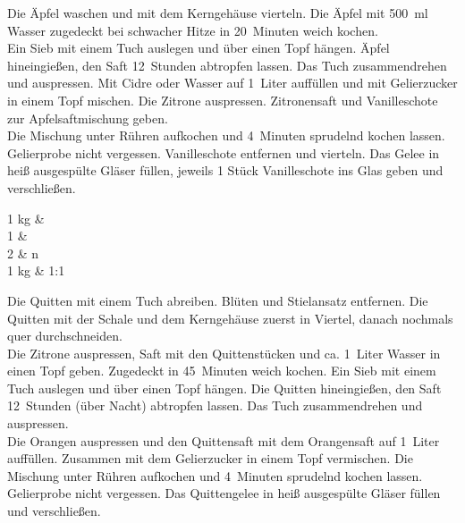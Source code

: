 
      \begin{zubereitung}
        Die Äpfel waschen und mit dem Kerngehäuse vierteln. Die Äpfel mit
	500~ml Wasser zugedeckt bei schwacher Hitze in 20~Minuten weich
	kochen. \\
	Ein Sieb mit einem Tuch auslegen und über einen Topf hängen. Äpfel
	hineingießen, den Saft 12~Stunden abtropfen lassen. Das Tuch
	zusammendrehen und auspressen. Mit Cidre oder Wasser auf 1~Liter auffüllen
	und mit Gelierzucker in einem Topf mischen. Die Zitrone auspressen.
	Zitronensaft und Vanilleschote zur Apfelsaftmischung geben. \\
	Die Mischung unter Rühren aufkochen und 4~Minuten sprudelnd kochen
	lassen. Gelierprobe nicht vergessen. Vanilleschote entfernen und
	vierteln. Das Gelee in heiß ausgespülte Gläser füllen, jeweils 1 Stück
	Vanilleschote ins Glas geben und verschließen. \\
      \end{zubereitung}


      \begin{zutaten}
        1\breh{} kg &  \\
	1 &  \\
	2 & n \\
	1 kg &  1:1 \\
      \end{zutaten}


      \begin{zubereitung}
        Die Quitten mit einem Tuch abreiben. Blüten und Stielansatz entfernen.
	Die Quitten mit der Schale und dem Kerngehäuse zuerst in Viertel,
	danach nochmals quer durchschneiden. \\
	Die Zitrone auspressen, Saft mit den Quittenstücken und ca.
	1\brev{}~Liter Wasser in einen Topf geben. Zugedeckt in 45~Minuten
	weich kochen. Ein Sieb mit einem Tuch auslegen und über einen Topf
	hängen. Die Quitten hineingießen, den Saft 12~Stunden (über Nacht)
	abtropfen lassen. Das Tuch zusammendrehen und auspressen. \\
	Die Orangen auspressen und den Quittensaft mit dem Orangensaft auf
	1~Liter auffüllen. Zusammen mit dem Gelierzucker in einem Topf
	vermischen. Die Mischung unter Rühren aufkochen und 4~Minuten sprudelnd
	kochen lassen. Gelierprobe nicht vergessen. Das Quittengelee in heiß
	ausgespülte Gläser füllen und verschließen. \\
      \end{zubereitung}

